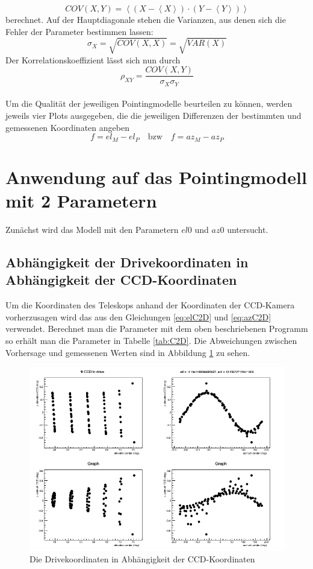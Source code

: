 \begin{equation}
COV(X,Y)=\left<\left(X-\left<X\right>\right)\cdot\left(Y-\left<Y\right>\right)\right>
\end{equation}
berechnet. Auf der Hauptdiagonale stehen die Varianzen, aus denen sich die Fehler der Parameter bestimmen lassen:
\begin{equation}
\sigma_X=\sqrt{COV(X,X)}=\sqrt{VAR(X)}
\end{equation}
Der Korrelationskoeffizient lässt sich nun durch
\begin{equation}
\rho_{XY}=\frac{COV(X,Y)}{\sigma_X\sigma_Y}
\end{equation}\\
Um die Qualität der jeweiligen Pointingmodelle beurteilen zu können, werden jeweils vier Plots ausgegeben, die die jeweiligen Differenzen der bestimmten und gemessenen Koordinaten angeben
\begin{equation}
f=el_M-el_P \quad \textrm{bzw} \quad f=az_M-az_P
\end{equation}
\section{Anwendung auf das Pointingmodell mit 2 Parametern}
Zunächst wird das Modell mit den Parametern $el0$ und $az0$ untersucht.
\subsection{Abhängigkeit der Drivekoordinaten in Abhängigkeit der CCD-Koordinaten}
Um die Koordinaten des Teleskops anhand der Koordinaten der CCD-Kamera vorherzusagen wird das aus den Gleichungen \ref{eq:elC2D} und \ref{eq:azC2D} verwendet. Berechnet man die Parameter mit dem oben beschriebenen Programm so erhält man die Parameter in Tabelle \ref{tab:C2D}. Die Abweichungen zwischen Vorhersage und gemessenen Werten sind in Abbildung \ref{img:C2D} zu sehen.
\begin{figure}[htbp]
\centering
\includegraphics[width=\textwidth]{../341/run341C2D.png}
\caption{Die Drivekoordinaten in Abhängigkeit der CCD-Koordinaten}
\label{img:C2D}
\end{figure}

